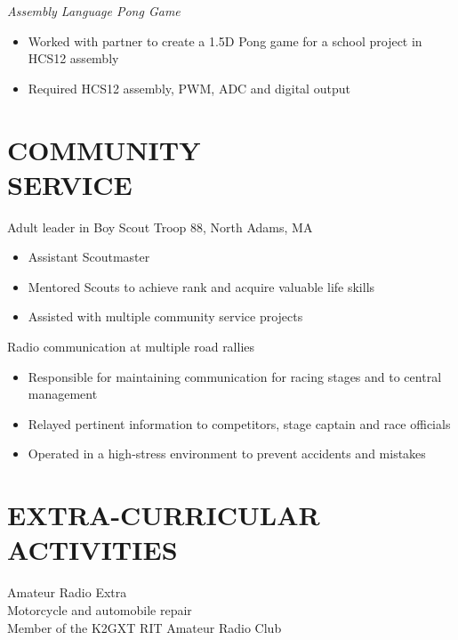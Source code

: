 \documentclass[line,margin]{res}
\begin{document}
\begin{resume}
	\vspace{-10pt}
	{\sl Assembly Language Pong Game}
		\begin{itemize} \itemsep -2pt
			\item Worked with partner to create a 1.5D Pong game for a school project in HCS12 assembly
			\item Required HCS12 assembly, PWM, ADC and digital output
		\end{itemize}
\section{COMMUNITY \\ SERVICE}  
	Adult leader in Boy Scout Troop 88, North Adams, MA
	\begin{itemize}  \itemsep -2pt %
		\item Assistant Scoutmaster
		\item Mentored Scouts to achieve rank and acquire valuable life skills%
		\item Assisted with multiple community service projects
	\end{itemize}
	\vspace{-5pt}
	Radio communication at multiple road rallies
	\begin{itemize}  \itemsep -2pt %
		\item Responsible for maintaining communication for racing stages and to central management
		\item Relayed pertinent information to competitors, stage captain and race officials
		\item Operated in a high-stress environment to prevent accidents and mistakes		
	\end{itemize}

\section{EXTRA-CURRICULAR \\ ACTIVITIES}             
	Amateur Radio Extra\\
	Motorcycle and automobile repair\\
	Member of the K2GXT RIT Amateur Radio Club\\


\end{resume}
\end{document}
